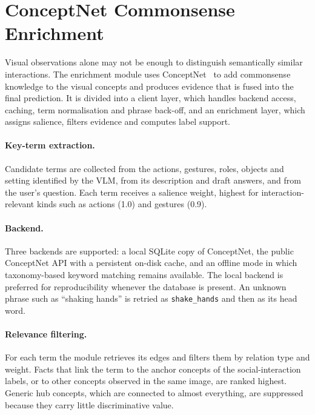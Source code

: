 \documentclass[12pt,a4paper,oneside]{report}
\newcommand{\code}[1]{\texttt{#1}}
\begin{document}
\section{ConceptNet Commonsense Enrichment}
\label{sec:conceptnet}

Visual observations alone may not be enough to distinguish semantically similar
interactions. The enrichment module uses ConceptNet~\cite{speer2017conceptnet}
to add commonsense knowledge to the visual concepts and produces evidence that
is fused into the final prediction. It is divided into a client layer, which
handles backend access, caching, term normalisation and phrase back-off, and an
enrichment layer, which assigns salience, filters evidence and computes label
support.

\paragraph{Key-term extraction.} Candidate terms are collected from the actions,
gestures, roles, objects and setting identified by the VLM, from its description
and draft answers, and from the user's question. Each term receives a salience
weight, highest for interaction-relevant kinds such as actions (1.0) and
gestures (0.9).

\paragraph{Backend.} Three backends are supported: a local SQLite copy of
ConceptNet, the public ConceptNet API with a persistent on-disk cache, and an
offline mode in which taxonomy-based keyword matching remains available. The
local backend is preferred for reproducibility whenever the database is present.
An unknown phrase such as ``shaking hands'' is retried as \code{shake\_hands}
and then as its head word.

\paragraph{Relevance filtering.} For each term the module retrieves its edges
and filters them by relation type and weight. Facts that link the term to the
anchor concepts of the social-interaction labels, or to other concepts observed
in the same image, are ranked highest. Generic hub concepts, which are connected
to almost everything, are suppressed because they carry little discriminative
value.
\end{document}
